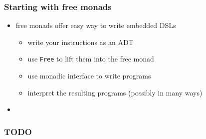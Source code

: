 \documentclass[compress]{beamer}
\begin{document}
\begin{frame}
  \frametitle{Starting with free monads}
  \begin{itemize}
  \item free monads offer easy way to write embedded DSLs
    \begin{itemize}
    \item write your instructions as an ADT
    \item use \texttt{Free} to lift them into the free monad
    \item use monadic interface to write programs
    \item interpret the resulting programs (possibly in many ways)
    \end{itemize}
  \item
  \end{itemize}
\end{frame}

\begin{frame}
  \frametitle{TODO}
\end{frame}
\end{document}
